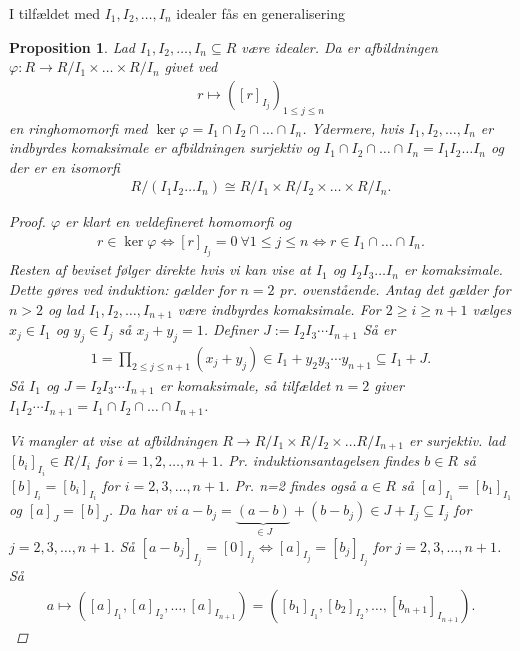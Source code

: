 \documentclass[10pt,twoside,openany,final]{memoir}
\theoremstyle{break}
\newtheorem{proposition}[section]{Proposition}
\theoremstyle{Break}
\begin{document}
I tilfældet med $I_1,I_2,\dots,I_n$ idealer fås en generalisering
\begin{proposition}
Lad $I_1,I_2,\dots,I_n \subseteq R$ være idealer. Da er afbildningen $\varphi \colon R \to R/I_1 \times \dots \times R/I_n$ givet ved
\begin{align*}
r \mapsto ([r]_{I_j})_{1 \leq j \leq n}
\end{align*}
en ringhomomorfi med $\ker \varphi = I_1 \cap I_2 \cap \dots \cap I_n$. Ydermere, hvis $I_1,I_2,\dots,I_n$ er indbyrdes komaksimale er afbildningen surjektiv og $I_1 \cap I_2 \cap \dots \cap I_n=I_1I_2\dots I_n$ og der er en isomorfi
\begin{align*}
R/(I_1I_2\dots I_n) \cong R/I_1 \times R/I_2 \times \dots \times R/I_n.
\end{align*}
\begin{proof}
$\varphi$ er klart en veldefineret homomorfi og 
\begin{align*}
r \in \ker \varphi \iff [r]_{I_j} = 0\ \forall 1 \leq j \leq n \iff r \in I_1 \cap \dots \cap I_n.
\end{align*} 
Resten af beviset følger direkte hvis vi kan vise at $I_1$ og $I_2 I_3 \dots I_n$ er komaksimale. Dette gøres ved induktion: gælder for $n=2$ pr. ovenstående. Antag det gælder for $n > 2$ og lad $I_1,I_2,\dots, I_{n+1}$ være indbyrdes komaksimale. For $2 \geq i \geq n+1$ vælges $x_j \in I_1$ og $y_j \in I_j$ så $x_j+y_j=1$. Definer $J:=I_2 I_3 \cdots I_{n+1}$ Så er
\begin{align*}
1=\prod_{2 \leq j \leq n+1}(x_j+y_j) \in I_1+y_2y_3\cdots y_{n+1} \subseteq I_1 + J.
\end{align*}
Så $I_1$ og $J=I_2I_3 \cdots I_{n+1}$ er komaksimale, så tilfældet $n=2$ giver $I_1I_2 \cdots I_{n+1}=I_1 \cap I_2 \cap \dots \cap I_{n+1}$.

Vi mangler at vise at afbildningen $R \to R/I_1 \times R/I_2 \times \dots R/I_{n+1}$ er surjektiv. lad $[b_i]_{I_i} \in R/I_i$ for $i=1,2,\dots,n+1$. Pr. induktionsantagelsen findes $b \in R$ så $[b]_{I_i}=[b_i]_{I_i}$ for $i=2,3,\dots,n+1$. Pr. n=2 findes også $a \in R$ så $[a]_{I_1}=[b_1]_{I_1}$ og $[a]_J=[b]_J$. Da har vi $a-b_j=\underbrace{(a-b)}_{\in J}+(b-b_j)\in J+I_j\subseteq I_j$ for $j=2,3,\dots,n+1$. Så $[a-b_j]_{I_j}=[0]_{I_j} \iff [a]_{I_j}=[b_j]_{I_j}$ for $j=2,3,\dots,n+1$. Så
\begin{align*}
a \mapsto ([a]_{I_1},[a]_{I_2},\dots,[a]_{I_{n+1}})=([b_1]_{I_1},[b_2]_{I_2},\dots,[b_{n+1}]_{I_{n+1}}).
\end{align*}
\end{proof}
\end{proposition}
\end{document}
